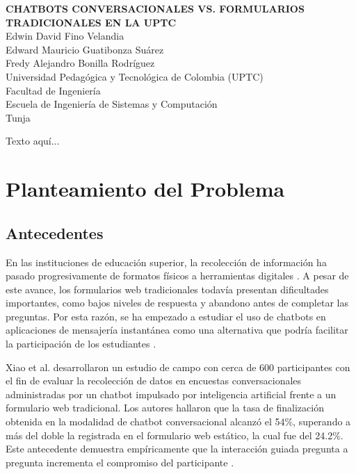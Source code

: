 \documentclass[12pt,letterpaper]{article}
\begin{document}
\begin{titlepage}
    \thispagestyle{empty}
    \centering
    \vspace*{2cm}
    {\LARGE \textbf{CHATBOTS CONVERSACIONALES VS. FORMULARIOS TRADICIONALES EN LA UPTC}}\\[3cm]
    {\large Edwin David Fino Velandia\\ Edward Mauricio Guatibonza Suárez\\ Fredy Alejandro Bonilla Rodríguez}\\[2cm]
    {\large Universidad Pedagógica y Tecnológica de Colombia (UPTC)}\\
    {\large Facultad de Ingeniería}\\
    {\large Escuela de Ingeniería de Sistemas y Computación}\\[2cm]
    {\large Tunja}\\
    {\large \the\year}
\end{titlepage}

\newpage

\thispagestyle{empty}
\tableofcontents
\newpage

\setcounter{page}{1}

Texto aquí...

\section{Planteamiento del Problema}

\subsection{Antecedentes}

En las instituciones de educación superior, la recolección de información ha pasado progresivamente de formatos físicos a herramientas digitales \cite{kim2019, hernandez2014}. A pesar de este avance, los formularios web tradicionales todavía presentan dificultades importantes, como bajos niveles de respuesta y abandono antes de completar las preguntas. Por esta razón, se ha empezado a estudiar el uso de chatbots en aplicaciones de mensajería instantánea como una alternativa que podría facilitar la participación de los estudiantes \cite{xiao2020, beam2023}.

Xiao et al. \cite{xiao2020} desarrollaron un estudio de campo con cerca de 600 participantes con el fin de evaluar la recolección de datos en encuestas conversacionales administradas por un chatbot impulsado por inteligencia artificial frente a un formulario web tradicional. Los autores hallaron que la tasa de finalización obtenida en la modalidad de chatbot conversacional alcanzó el 54\%, superando a más del doble la registrada en el formulario web estático, la cual fue del 24.2\%. Este antecedente demuestra empíricamente que la interacción guiada pregunta a pregunta incrementa el compromiso del participante \cite{xiao2020}.
\end{document}

